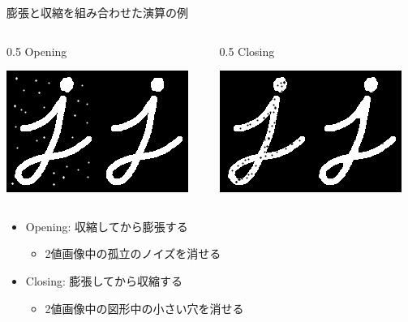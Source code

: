 \documentclass[10pt]{beamer}
\begin{document}
	\begin{frame}{膨張と収縮を組み合わせた演算の例}
	    \begin{columns}
	        \begin{column}[c]{0.5\hsize}\centering
	            Opening \par
    	        \includegraphics[width=0.9\hsize]{figs/opening.png}
	        \end{column}
	        \begin{column}[c]{0.5\hsize}\centering
	            Closing \par
    	        \includegraphics[width=0.9\hsize]{figs/closing.png}
	        \end{column}
	    \end{columns}
	    \begin{itemize}
	        \item Opening: 収縮してから膨張する
	            \begin{itemize}
	                \item 2値画像中の孤立のノイズを消せる
	            \end{itemize}
	        \item Closing: 膨張してから収縮する
	            \begin{itemize}
	                \item 2値画像中の図形中の小さい穴を消せる
	            \end{itemize}
	    \end{itemize}
	\end{frame}
	
\end{document}
